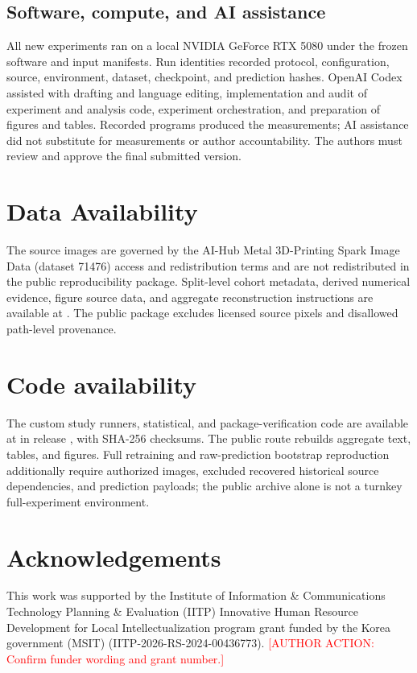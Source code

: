 \documentclass[11pt]{article}
\newcommand{\authoraction}[1]{\textcolor{red}{[AUTHOR ACTION: #1]}}
\begin{document}
\subsection{Software, compute, and AI assistance}
All new experiments ran on a local NVIDIA GeForce RTX 5080 under the frozen software and input manifests. Run identities recorded protocol, configuration, source, environment, dataset, checkpoint, and prediction hashes. OpenAI Codex assisted with drafting and language editing, implementation and audit of experiment and analysis code, experiment orchestration, and preparation of figures and tables. Recorded programs produced the measurements; AI assistance did not substitute for measurements or author accountability. The authors must review and approve the final submitted version.

\section*{Data Availability}
The source images are governed by the AI-Hub Metal 3D-Printing Spark Image Data (dataset 71476) access and redistribution terms and are not redistributed in the public reproducibility package. Split-level cohort metadata, derived numerical evidence, figure source data, and aggregate reconstruction instructions are available at \ReleaseURL. The public package excludes licensed source pixels and disallowed path-level provenance.

\section*{Code availability}
The custom study runners, statistical, and package-verification code are available at \ReleaseURL in release \ReleaseVersion, with SHA-256 checksums. The public route rebuilds aggregate text, tables, and figures. Full retraining and raw-prediction bootstrap reproduction additionally require authorized images, excluded recovered historical source dependencies, and prediction payloads; the public archive alone is not a turnkey full-experiment environment.




\section*{Acknowledgements}
This work was supported by the Institute of Information \& Communications Technology Planning \& Evaluation (IITP) Innovative Human Resource Development for Local Intellectualization program grant funded by the Korea government (MSIT) (IITP-2026-RS-2024-00436773). \authoraction{Confirm funder wording and grant number.}
\end{document}
